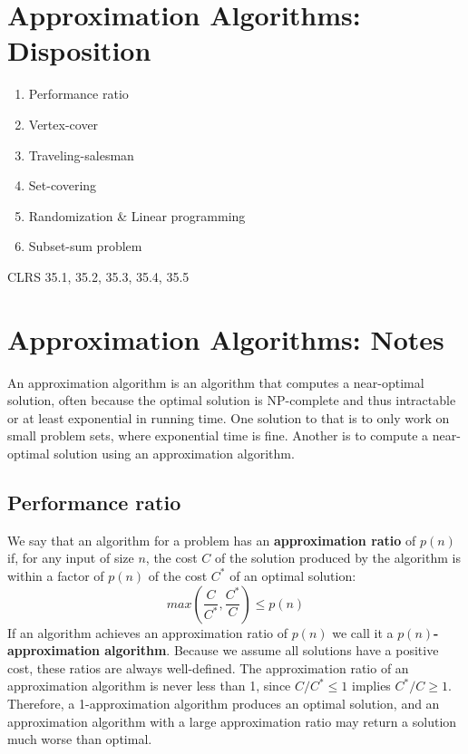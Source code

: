 \section{Approximation Algorithms: Disposition}
\begin{enumerate}
	\item Performance ratio
	\item Vertex-cover
	\item Traveling-salesman
	\item Set-covering
	\item Randomization \& Linear programming
	\item Subset-sum problem
\end{enumerate}

CLRS 35.1, 35.2, 35.3, 35.4, 35.5

\section{Approximation Algorithms: Notes}
An approximation algorithm is an algorithm that computes a near-optimal solution,
often because the optimal solution is NP-complete and thus intractable or at least
exponential in running time. One solution to that is to only work on small problem sets,
where exponential time is fine. Another is to compute a near-optimal solution using an
approximation algorithm.

\subsection{Performance ratio}
We say that an algorithm for a problem has an \textbf{approximation ratio} of
$p(n)$ if, for any input of size $n$, the cost $C$ of the solution produced by
the algorithm is within a factor of $p(n)$ of the cost $C^*$ of an optimal
solution:
%
\[
	max\left( \frac{C}{C^*}, \frac{C^*}{C}\right) \leq p(n)
\]
%
If an algorithm achieves an approximation ratio of $p(n)$ we call it a
$p(n)$\textbf{-approximation algorithm}. Because we assume all solutions have
a positive cost, these ratios are always well-defined. The approximation ratio of
an approximation algorithm is never less than 1, since $C/C^*\leq 1$ implies $C^*/C \geq 1$.
Therefore, a 1-approximation algorithm produces an optimal solution, and an approximation
algorithm with a large approximation ratio may return a solution much worse than optimal.

